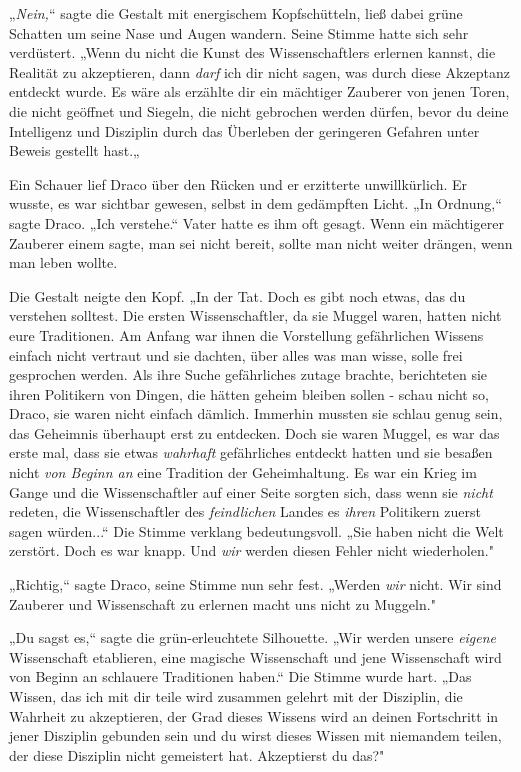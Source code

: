 {„\emph{Nein,}“ sagte die Gestalt mit energischem Kopfschütteln, ließ dabei grüne Schatten um seine Nase und Augen wandern. Seine Stimme hatte sich sehr verdüstert. „Wenn du nicht die Kunst des Wissenschaftlers erlernen kannst, die Realität zu akzeptieren, dann \emph{darf} ich dir nicht sagen, was durch diese Akzeptanz entdeckt wurde. Es wäre als erzählte dir ein mächtiger Zauberer von jenen Toren, die nicht geöffnet und Siegeln, die nicht gebrochen werden dürfen, bevor du deine Intelligenz und Disziplin durch das Überleben der geringeren Gefahren unter Beweis gestellt hast.„

Ein Schauer lief Draco über den Rücken und er erzitterte unwillkürlich. Er wusste, es war sichtbar gewesen, selbst in dem gedämpften Licht. „In Ordnung,“ sagte Draco. „Ich verstehe.“ Vater hatte es ihm oft gesagt. Wenn ein mächtigerer Zauberer einem sagte, man sei nicht bereit, sollte man nicht weiter drängen, wenn man leben wollte.

Die Gestalt neigte den Kopf. „In der Tat. Doch es gibt noch etwas, das du verstehen solltest. Die ersten Wissenschaftler, da sie Muggel waren, hatten nicht eure Traditionen. Am Anfang war ihnen die Vorstellung gefährlichen Wissens einfach nicht vertraut und sie dachten, über alles was man wisse, solle frei gesprochen werden. Als ihre Suche gefährliches zutage brachte, berichteten sie ihren Politikern von Dingen, die hätten geheim bleiben sollen - schau nicht so, Draco, sie waren nicht einfach dämlich. Immerhin mussten sie schlau genug sein, das Geheimnis überhaupt erst zu entdecken. Doch sie waren Muggel, es war das erste mal, dass sie etwas \emph{wahrhaft} gefährliches entdeckt hatten und sie besaßen nicht \emph{von Beginn an} eine Tradition der Geheimhaltung. Es war ein Krieg im Gange und die Wissenschaftler auf einer Seite sorgten sich, dass wenn sie \emph{nicht} redeten, die Wissenschaftler des \emph{feindlichen} Landes es \emph{ihren} Politikern zuerst sagen würden...“ Die Stimme verklang bedeutungsvoll. „Sie haben nicht die Welt zerstört. Doch es war knapp. Und \emph{wir} werden diesen Fehler nicht wiederholen."

„Richtig,“ sagte Draco, seine Stimme nun sehr fest. „Werden \emph{wir} nicht. Wir sind Zauberer und Wissenschaft zu erlernen macht uns nicht zu Muggeln."

„Du sagst es,“ sagte die grün-erleuchtete Silhouette. „Wir werden unsere \emph{eigene} Wissenschaft etablieren, eine magische Wissenschaft und jene Wissenschaft wird von Beginn an schlauere Traditionen haben.“ Die Stimme wurde hart. „Das Wissen, das ich mit dir teile wird zusammen gelehrt mit der Disziplin, die Wahrheit zu akzeptieren, der Grad dieses Wissens wird an deinen Fortschritt in jener Disziplin gebunden sein und du wirst dieses Wissen mit niemandem teilen, der diese Disziplin nicht gemeistert hat. Akzeptierst du das?"

}
